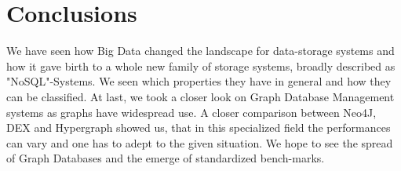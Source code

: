 \documentclass{acm_proc_article-sp}
\begin{document}
\section{Conclusions}

We have seen how Big Data changed the landscape for data-storage systems and how it gave birth to a whole new family of storage systems, broadly described as "NoSQL"-Systems. We seen which properties they have in general and how they can be classified. At last, we took a closer look on Graph Database Management systems as graphs have widespread use. A closer comparison between Neo4J, DEX and Hypergraph showed us, that in this specialized field the performances can vary and one has to adept to the given situation. We hope to see the spread of Graph Databases and the emerge of standardized bench-marks.


%

%
%
\end{document}
